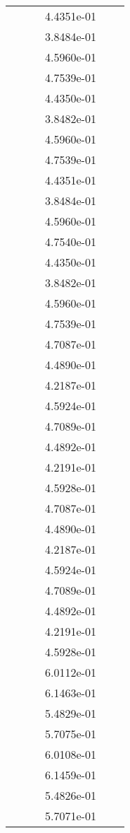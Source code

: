\begin{xltabular}{\textwidth}{r|rS[table-format=1.3e+2]S[table-format=1.4e+2]S[table-format=1.4e+2]S[table-format=-1.5]}
&  &  & 4.4351e-01 & & \\
&  &  & 3.8484e-01 & & \\
&  &  & 4.5960e-01 & & \\
&  &  & 4.7539e-01 & & \\
&  &  & 4.4350e-01 & & \\
&  &  & 3.8482e-01 & & \\
&  &  & 4.5960e-01 & & \\
&  &  & 4.7539e-01 & & \\
&  &  & 4.4351e-01 & & \\
&  &  & 3.8484e-01 & & \\
&  &  & 4.5960e-01 & & \\
&  &  & 4.7540e-01 & & \\
&  &  & 4.4350e-01 & & \\
&  &  & 3.8482e-01 & & \\
&  &  & 4.5960e-01 & & \\
&  &  & 4.7539e-01 & & \\
&  &  & 4.7087e-01 & & \\
&  &  & 4.4890e-01 & & \\
&  &  & 4.2187e-01 & & \\
&  &  & 4.5924e-01 & & \\
&  &  & 4.7089e-01 & & \\
&  &  & 4.4892e-01 & & \\
&  &  & 4.2191e-01 & & \\
&  &  & 4.5928e-01 & & \\
&  &  & 4.7087e-01 & & \\
&  &  & 4.4890e-01 & & \\
&  &  & 4.2187e-01 & & \\
&  &  & 4.5924e-01 & & \\
&  &  & 4.7089e-01 & & \\
&  &  & 4.4892e-01 & & \\
&  &  & 4.2191e-01 & & \\
&  &  & 4.5928e-01 & & \\
&  &  & 6.0112e-01 & & \\
&  &  & 6.1463e-01 & & \\
&  &  & 5.4829e-01 & & \\
&  &  & 5.7075e-01 & & \\
&  &  & 6.0108e-01 & & \\
&  &  & 6.1459e-01 & & \\
&  &  & 5.4826e-01 & & \\
&  &  & 5.7071e-01 & & \\

\end{xltabular}
